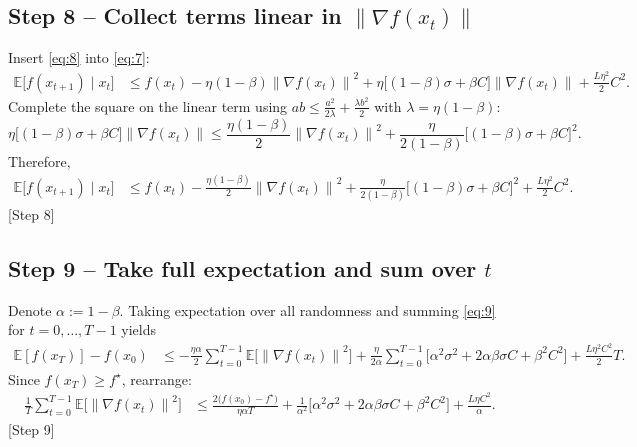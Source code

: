 \documentclass{article}
\newcommand{\EE}{\mathbb{E}}
\newcommand{\norm}[1]{\left\|#1\right\|}
\newcommand{\grad}{\nabla}
\begin{document}
\subsection*{Step 8 – Collect terms linear in $\norm{\grad f(x_t)}$}
Insert \eqref{eq:8} into \eqref{eq:7}:
\begin{align}
    \EE\!\bigl[f(x_{t+1})\mid x_t\bigr]
    &\le f(x_t) -\eta(1-\beta)\norm{\grad f(x_t)}^2
          +\eta\bigl[(1-\beta)\sigma+\beta C\bigr]\norm{\grad f(x_t)}
          +\frac{L\eta^2}{2}C^2 .
\end{align}
Complete the square on the linear term using $ab\le \frac{a^2}{2\lambda}+\frac{\lambda b^2}{2}$ with $\lambda=\eta(1-\beta)$:
\[
    \eta\bigl[(1-\beta)\sigma+\beta C\bigr]\norm{\grad f(x_t)}
    \le \frac{\eta(1-\beta)}{2}\norm{\grad f(x_t)}^2
        +\frac{\eta}{2(1-\beta)}\bigl[(1-\beta)\sigma+\beta C\bigr]^2 .
\]
Therefore,
\begin{align}
    \EE\!\bigl[f(x_{t+1})\mid x_t\bigr]
    &\le f(x_t) -\frac{\eta(1-\beta)}{2}\norm{\grad f(x_t)}^2
          +\frac{\eta}{2(1-\beta)}\bigl[(1-\beta)\sigma+\beta C\bigr]^2
          +\frac{L\eta^2}{2}C^2 .
\tag{9}
\end{align}
[Step 8]

\subsection*{Step 9 – Take full expectation and sum over $t$}
Denote $\alpha:=1-\beta$. Taking expectation over all randomness and summing \eqref{eq:9} for $t=0,\dots,T-1$ yields
\begin{align}
    \EE[f(x_T)] - f(x_0)
    &\le -\frac{\eta\alpha}{2}\sum_{t=0}^{T-1}\EE\!\bigl[\norm{\grad f(x_t)}^2\bigr]
      +\frac{\eta}{2\alpha}\sum_{t=0}^{T-1}\bigl[\alpha^2\sigma^2+2\alpha\beta\sigma C+\beta^2 C^2\bigr]
      +\frac{L\eta^2 C^2}{2}T .
\end{align}
Since $f(x_T)\ge f^\star$, rearrange:
\begin{align}
    \frac{1}{T}\sum_{t=0}^{T-1}\EE\!\bigl[\norm{\grad f(x_t)}^2\bigr]
    &\le \frac{2\bigl(f(x_0)-f^\star\bigr)}{\eta\alpha T}
       +\frac{1}{\alpha^2}\bigl[\alpha^2\sigma^2+2\alpha\beta\sigma C+\beta^2 C^2\bigr]
       +\frac{L\eta C^2}{\alpha} .
\tag{10}
\end{align}
[Step 9]
\end{document}
